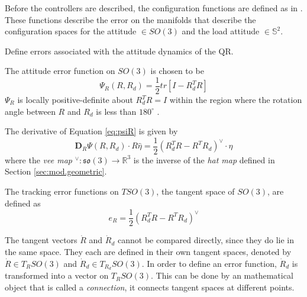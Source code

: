 Before the controllers are described, the configuration functions are defined as in \cite{Bullo2005}. 
These functions describe the error on the manifolds that describe the configuration spaces for the  attitude $ \in SO(3) $ and the load attitude $ \in \mathbb{S}^2 $.

Define errors associated with the attitude dynamics of the QR. 


The  attitude error function on $ SO(3) $ is chosen to be \cite{Lee2010}
\begin{equation}\label{eq:psiR}
\Psi_R(R,R_d)=\frac{1}{2}tr\left[I-R_d^TR\right]
\end{equation}
$ \Psi_R $ is locally positive-definite about $ R^T_dR=I $ within the region where the rotation angle between $ R $ and $ R_d $ is less than $ 180^\circ $ \cite{Bullo2005}. 


The derivative of Equation \ref{eq:psiR} is given by 
\begin{equation}\label{key}
\mathbf{D}_R\Psi(R,R_d)\cdot R\hat{\eta}=\frac{1}{2}(R^T_dR-R^TR_d)^\vee\cdot\eta
\end{equation}
where the \textit{vee map} $ ^\vee:\mathfrak{so}(3)\rightarrow\mathbb{R}^3 $ is the inverse of the \textit{hat map} defined in Section \ref{sec:mod.geometric}.

The tracking error functions on $ TSO(3) $, the tangent space of $ SO(3) $, are defined as
\begin{equation}\label{key}
e_R=\frac{1}{2}(R_d^TR-R^TR_d)^\vee
\end{equation}


The tangent vectors $ \dot{R} $ and $ \dot{R}_d $ cannot be compared directly, since they do lie in the same space. They each are defined in their own tangent spaces, denoted by $ \dot{R} \in T_RSO(3)$ and $ \dot{R}_d \in T_{R_d}SO(3)$. In order to define an error function, $ \dot{R}_d $ is transformed into a vector on $ T_RSO(3) $. This can be done by an mathematical object that is called a \textit{connection}, it connects tangent spaces at different points.

